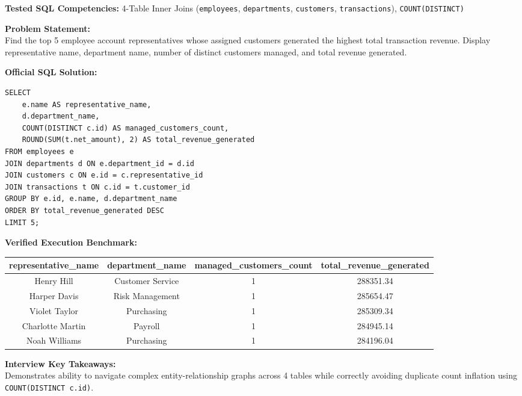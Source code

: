 \documentclass[11pt,a4paper]{article}
\begin{document}
\noindent\textbf{Tested SQL Competencies:} 4-Table Inner Joins (\texttt{employees}, \texttt{departments}, \texttt{customers}, \texttt{transactions}), \texttt{COUNT(DISTINCT)}

\vspace{0.15cm}
\noindent\textbf{Problem Statement:} \\
Find the top 5 employee account representatives whose assigned customers generated the highest total transaction revenue. Display representative name, department name, number of distinct customers managed, and total revenue generated.

\vspace{0.25cm}
\noindent\textbf{Official SQL Solution:}
\begin{verbatim}
SELECT 
    e.name AS representative_name,
    d.department_name,
    COUNT(DISTINCT c.id) AS managed_customers_count,
    ROUND(SUM(t.net_amount), 2) AS total_revenue_generated
FROM employees e
JOIN departments d ON e.department_id = d.id
JOIN customers c ON e.id = c.representative_id
JOIN transactions t ON c.id = t.customer_id
GROUP BY e.id, e.name, d.department_name
ORDER BY total_revenue_generated DESC
LIMIT 5;
\end{verbatim}

\vspace{0.15cm}
\noindent\textbf{Verified Execution Benchmark:}
\begin{center}
\small
\begin{tabular}{cccc}
\toprule
\textbf{representative\_name} & \textbf{department\_name} & \textbf{managed\_customers\_count} & \textbf{total\_revenue\_generated} \\
\midrule
Henry Hill & Customer Service & 1 & 288351.34 \\
Harper Davis & Risk Management & 1 & 285654.47 \\
Violet Taylor & Purchasing & 1 & 285309.34 \\
Charlotte Martin & Payroll & 1 & 284945.14 \\
Noah Williams & Purchasing & 1 & 284196.04 \\
\bottomrule
\end{tabular}
\end{center}

\vspace{0.15cm}
\noindent\textbf{Interview Key Takeaways:} \\
Demonstrates ability to navigate complex entity-relationship graphs across 4 tables while correctly avoiding duplicate count inflation using \texttt{COUNT(DISTINCT c.id)}.
\end{document}
